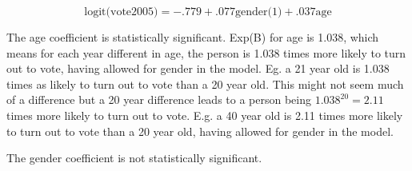 \documentclass[a4paper,12pt]{article}
\begin{document}

\[\mbox{logit(vote2005)} = -.779 + .077\mbox{gender(1)}+.037\mbox{age}\]

The age coefficient is statistically significant. Exp(B) for age is 1.038, which
means for each year different in age, the person is 1.038 times more likely to turn
out to vote, having allowed for gender in the model. Eg. a 21 year old is 1.038
times as likely to turn out to vote than a 20 year old. This might not seem much
of a difference but a 20 year difference leads to a person being $1.038^20 = 2.11$
times more likely to turn out to vote. E.g. a 40 year old is 2.11 times more likely to
turn out to vote than a 20 year old, having allowed for gender in the model.


The gender coefficient is not statistically significant.
\end{document}
